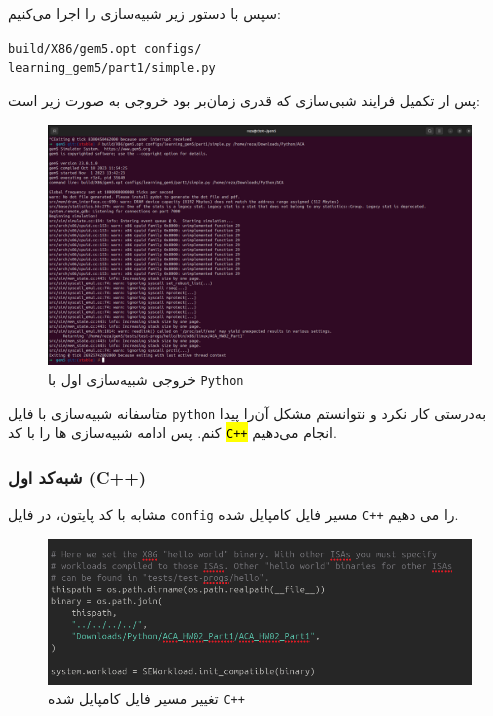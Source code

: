 \documentclass[12pt]{exam}
\begin{document}
\begin{multicols}{1}
	  سپس با دستور زیر شبیه‌سازی را اجرا می‌کنیم:
	  \begin{latin}
	  	\texttt{build/X86/‫‪gem5.opt‬‬ configs/}\\
	  	\texttt{learning\_gem5/part1/simple.py}
	  \end{latin}
	  
	  پس ار تکمیل فرایند شبی‌سازی که قدری زمان‌بر بود خروجی به صورت زیر است:
	  \begin{center}
	  	\begin{figure}[H]
	  		\includegraphics[scale=0.13]{images/img2.png}
	  		\caption{خروجی شبیه‌سازی اول با \texttt{Python}}
	  		\label{خروجی شبیه‌سازی اول با پایتون}
	  	\end{figure}
	  \end{center}
	  
	  متاسفانه شبیه‌سازی با فایل \texttt{python} به‌درستی کار نکرد و نتوانستم مشکل آن‌را پیدا کنم. پس ادامه شبیه‌سازی ها را با کد \texttt{\hl{C++}} انجام می‌دهیم.
	  
	  
	  \subsubsection{شبه‌کد اول (C++)}
	  مشابه با کد پایتون، در فایل \texttt{config} مسیر فایل کامپایل شده \texttt{C++} را می دهیم.
	  \begin{center}
	  	\begin{figure}[H]
	  		\includegraphics[scale=0.29]{images/img3.png}
	  		\caption{تغییر مسیر فایل کامپایل شده \texttt{C++}}
	  		\label{تغییر مسیر فایل کامپایل شده cpp}
	  	\end{figure}
	  \end{center}
	  

\end{multicols}
\end{document}
